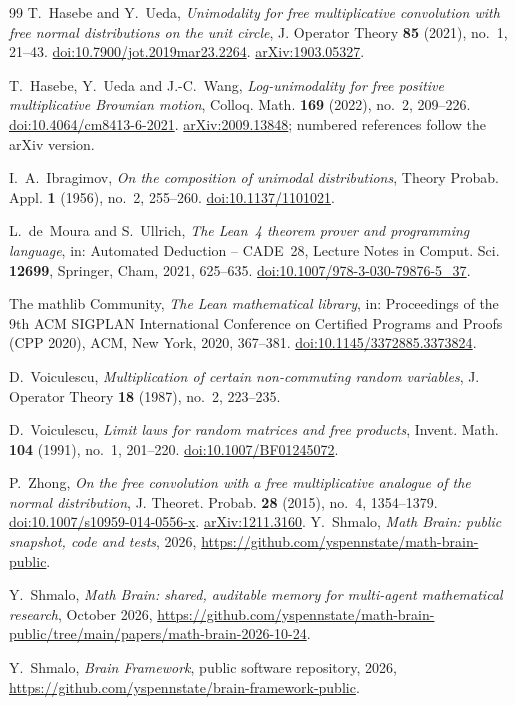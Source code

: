 \documentclass[11pt]{amsart}
\theoremstyle{remark}
\begin{document}
\begin{thebibliography}{99}
T.~Hasebe and Y.~Ueda,
\emph{Unimodality for free multiplicative convolution with free normal distributions on the unit circle},
J. Operator Theory \textbf{85} (2021), no.~1, 21--43.
\href{https://doi.org/10.7900/jot.2019mar23.2264}{doi:10.7900/jot.2019mar23.2264}.
\href{https://arxiv.org/abs/1903.05327}{arXiv:1903.05327}.

T.~Hasebe, Y.~Ueda and J.-C.~Wang,
\emph{Log-unimodality for free positive multiplicative Brownian motion},
Colloq. Math. \textbf{169} (2022), no.~2, 209--226.
\href{https://doi.org/10.4064/cm8413-6-2021}{doi:10.4064/cm8413-6-2021}.
\href{https://arxiv.org/abs/2009.13848}{arXiv:2009.13848}; numbered references follow the arXiv version.

I.~A.~Ibragimov,
\emph{On the composition of unimodal distributions},
Theory Probab. Appl. \textbf{1} (1956), no.~2, 255--260.
\href{https://doi.org/10.1137/1101021}{doi:10.1137/1101021}.

L.~de~Moura and S.~Ullrich,
\emph{The Lean~4 theorem prover and programming language},
in: Automated Deduction -- CADE~28, Lecture Notes in Comput. Sci. \textbf{12699}, Springer, Cham, 2021, 625--635.
\href{https://doi.org/10.1007/978-3-030-79876-5_37}{doi:10.1007/978-3-030-79876-5\_37}.

The mathlib Community,
\emph{The Lean mathematical library},
in: Proceedings of the 9th ACM SIGPLAN International Conference on Certified Programs and Proofs (CPP 2020), ACM, New York, 2020, 367--381.
\href{https://doi.org/10.1145/3372885.3373824}{doi:10.1145/3372885.3373824}.

D.~Voiculescu,
\emph{Multiplication of certain non-commuting random variables},
J. Operator Theory \textbf{18} (1987), no.~2, 223--235.

D.~Voiculescu,
\emph{Limit laws for random matrices and free products},
Invent. Math. \textbf{104} (1991), no.~1, 201--220.
\href{https://doi.org/10.1007/BF01245072}{doi:10.1007/BF01245072}.

P.~Zhong,
\emph{On the free convolution with a free multiplicative analogue of the normal distribution},
J. Theoret. Probab. \textbf{28} (2015), no.~4, 1354--1379.
\href{https://doi.org/10.1007/s10959-014-0556-x}{doi:10.1007/s10959-014-0556-x}.
\href{https://arxiv.org/abs/1211.3160}{arXiv:1211.3160}.
 Y.~Shmalo, \emph{Math Brain: public snapshot, code and tests}, 2026, \url{https://github.com/yspennstate/math-brain-public}.

 Y.~Shmalo, \emph{Math Brain: shared, auditable memory for multi-agent mathematical research}, October 2026, \url{https://github.com/yspennstate/math-brain-public/tree/main/papers/math-brain-2026-10-24}.

 Y.~Shmalo, \emph{Brain Framework}, public software repository, 2026, \url{https://github.com/yspennstate/brain-framework-public}.

\end{thebibliography}
\end{document}
